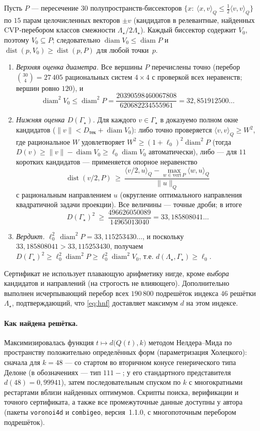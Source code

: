 \documentclass[12pt]{article}
\theoremstyle{definition}
\theoremstyle{remark}
\newcommand{\diam}{\operatorname{diam}}
\newcommand{\dist}{\operatorname{dist}}
\begin{document}
Пусть $P$ --- пересечение $30$ полупространств-биссекторов
$\{x:\ \langle x,v\rangle_Q\le\tfrac12\langle v,v\rangle_Q\}$ по $15$ парам
целочисленных векторов $\pm v$ (кандидатов в релевантные, найденных
CVP-перебором классов смежности $\Lambda_\star/2\Lambda_\star$). Каждый
биссектор содержит $V_0$, поэтому $V_0\subseteq P$; следовательно
$\diam V_0\le\diam P$ и $\dist(p,V_0)\ge\dist(p,P)$ для любой точки~$p$.
\begin{enumerate}
\item[(а)] \emph{Верхняя оценка диаметра.} Все вершины $P$ перечислены точно
(перебор $\binom{30}{4}=27\,405$ рациональных систем $4\times4$ с проверкой
всех неравенств; вершин ровно $120$), и
\[
\diam^2 V_0\le\diam^2 P=\frac{20390598460067808}{620682234555961}
=32{,}851912500\ldots
\]
\item[(б)] \emph{Нижняя оценка $D(\Gamma_\star)$.} Для каждого
$v\in\Gamma_\star$ в доказуемо полном окне кандидатов
($\|v\|<D_{\text{тек}}+\diam V_0$): либо точно проверяется
$\langle v,v\rangle_Q\ge W^2$, где рациональное $W$ удовлетворяет
$W^2\ge(1+\ell_0)^2\diam^2 P$ (тогда $D(v)\ge\|v\|-\diam V_0\ge\ell_0\diam V_0$
автоматически), либо --- для $11$ коротких кандидатов --- применяется опорное
неравенство
\[
\dist(v/2,P)\ \ge\ \frac{\langle v/2,u\rangle_Q-\max_{w\in\mathrm{vert}\,P}
\langle w,u\rangle_Q}{\|u\|_Q}
\]
с рациональным направлением $u$ (округление оптимального направления
квадратичной задачи проекции). Все величины --- точные дроби; в итоге
\[
D(\Gamma_\star)^2\ \ge\ \frac{496626050089}{14965013040}
=33{,}185808041\ldots
\]
\item[(в)] \emph{Вердикт.} $\ell_0^2\,\diam^2 P=33{,}115253430\ldots$, и
поскольку $33{,}185808041>33{,}115253430$, получаем
$D(\Gamma_\star)^2\ge\ell_0^2\diam^2 P\ge\ell_0^2\diam^2 V_0$, т.е.
$d(\Lambda_\star,\Gamma_\star)\ge\ell_0$.
\end{enumerate}
Сертификат не использует плавающую арифметику нигде, кроме \emph{выбора}
кандидатов и направлений (на строгость не влияющего). Дополнительно выполнен
исчерпывающий перебор всех $190\,800$ подрешёток индекса $46$ решётки
$\Lambda_\star$, подтверждающий, что \eqref{eq:hnf} доставляет максимум $d$ на
этом индексе.

\paragraph{Как найдена решётка.} Максимизировалась функция
$t\mapsto d\bigl(Q(t),k\bigr)$ методом Нелдера--Мида по пространству
положительно определённых форм (параметризация Холецкого): сначала для $k=48$
--- со стартом во вторичном конусе генерического типа Делоне (в обозначениях
\cite{VWZ} --- тип $111{-}$; у его стандартного представителя $d(48)=0{,}99941$),
затем последовательным спуском по $k$ с многократными рестартами вблизи
найденных оптимумов. Скрипты поиска, верификации и точного сертификата, а также
все промежуточные данные доступны у автора (пакеты \texttt{voronoi4d} и
\texttt{combigeo}, версия~1.1.0, с многопоточным перебором подрешёток).
\end{document}
